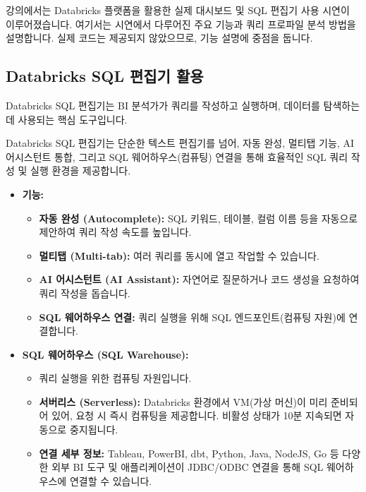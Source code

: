 \documentclass[11pt,a4paper]{article}
\begin{document}
강의에서는 Databricks 플랫폼을 활용한 실제 대시보드 및 SQL 편집기 사용 시연이 이루어졌습니다. 여기서는 시연에서 다루어진 주요 기능과 쿼리 프로파일 분석 방법을 설명합니다. 실제 코드는 제공되지 않았으므로, 기능 설명에 중점을 둡니다.

\subsection{Databricks SQL 편집기 활용}
Databricks SQL 편집기는 BI 분석가가 쿼리를 작성하고 실행하며, 데이터를 탐색하는 데 사용되는 핵심 도구입니다.

\begin{tcolorbox}[mybox={핵심 요약: SQL 분석가의 작업대}]
Databricks SQL 편집기는 단순한 텍스트 편집기를 넘어, 자동 완성, 멀티탭 기능, AI 어시스턴트 통합, 그리고 SQL 웨어하우스(컴퓨팅) 연결을 통해 효율적인 SQL 쿼리 작성 및 실행 환경을 제공합니다.
\end{tcolorbox}

\begin{itemize}
    \item \textbf{기능:}
    \begin{itemize}
        \item \textbf{자동 완성 (Autocomplete):} SQL 키워드, 테이블, 컬럼 이름 등을 자동으로 제안하여 쿼리 작성 속도를 높입니다.
        \item \textbf{멀티탭 (Multi-tab):} 여러 쿼리를 동시에 열고 작업할 수 있습니다.
        \item \textbf{AI 어시스턴트 (AI Assistant):} 자연어로 질문하거나 코드 생성을 요청하여 쿼리 작성을 돕습니다.
        \item \textbf{SQL 웨어하우스 연결:} 쿼리 실행을 위해 SQL 엔드포인트(컴퓨팅 자원)에 연결합니다.
    \end{itemize}
    \item \textbf{SQL 웨어하우스 (SQL Warehouse):}
    \begin{itemize}
        \item 쿼리 실행을 위한 컴퓨팅 자원입니다.
        \item \textbf{서버리스 (Serverless):} Databricks 환경에서 VM(가상 머신)이 미리 준비되어 있어, 요청 시 즉시 컴퓨팅을 제공합니다. 비활성 상태가 10분 지속되면 자동으로 중지됩니다.
        \item \textbf{연결 세부 정보:} Tableau, PowerBI, dbt, Python, Java, NodeJS, Go 등 다양한 외부 BI 도구 및 애플리케이션이 JDBC/ODBC 연결을 통해 SQL 웨어하우스에 연결할 수 있습니다.
    \end{itemize}
\end{itemize}
\end{document}

